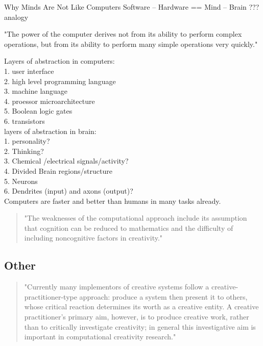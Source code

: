 Why Minds Are Not Like Computers \citep{Schulman2009}
Software – Hardware == Mind – Brain ??? analogy

"The power of the computer derives not from its ability to perform complex operations, but from its ability to perform many simple operations very quickly."

Layers of abstraction in computers:\\
1.	user interface\\
2.	high level programming language\\
3.	machine language\\
4.	proessor microarchitecture\\
5.	Boolean logic gates\\
6.	transistors\\

layers of abstraction in brain:\\
1.	personality?\\
2.	Thinking?\\
3.	Chemical /electrical signals/activity?\\
4.	Divided Brain regions/structure\\
5.	Neurons\\
6.	Dendrites (input) and axons (output)?\\


Computers are faster and better than humans in many tasks already.

\begin{quote}
"The weaknesses of the computational approach include its assumption that cognition can be reduced to mathematics and the difficulty of including noncognitive factors in creativity." \citep[p.457]{Mayer1999}
\end{quote}

\subsection{Other}

\begin{quote}
"Currently many implementors of creative systems follow a creative-practitioner-type approach: produce a system then present it to others, whose critical reaction determines its worth as a creative entity. A creative practitioner’s primary aim, however, is to produce creative work, rather than to critically investigate creativity; in general this investigative aim is important in computational creativity research." \citep{Jordanous2011}
\end{quote}

